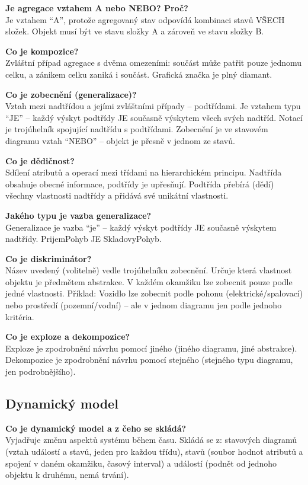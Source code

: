 \documentclass[12pt, a4paper]{article}
\begin{document}
\textbf{Je agregace vztahem A nebo NEBO? Proč?}\\
Je vztahem ``A'', protože agregovaný stav odpovídá kombinaci stavů VŠECH složek. Objekt musí být ve stavu složky A a zároveň ve stavu složky B.

\textbf{Co je kompozice?}\\
Zvláštní případ agregace s dvěma omezeními: součást může patřit pouze jednomu celku, a zánikem celku zaniká i součást. Grafická značka je plný diamant.

\textbf{Co je zobecnění (generalizace)?}\\
Vztah mezi nadtřídou a jejími zvláštními případy -- podtřídami. Je vztahem typu ``JE'' -- každý výskyt podtřídy JE současně výskytem všech svých nadtříd. Notací je trojúhelník spojující nadtřídu s podtřídami. Zobecnění je ve stavovém diagramu vztah ``NEBO'' -- objekt je přesně v jednom ze stavů.

\textbf{Co je dědičnost?}\\
Sdílení atributů a operací mezi třídami na hierarchickém principu. Nadtřída obsahuje obecné informace, podtřídy je upřesňují. Podtřída přebírá (dědí) všechny vlastnosti nadtřídy a přidává své unikátní vlastnosti.

\textbf{Jakého typu je vazba generalizace?}\\
Generalizace je vazba ``je'' -- každý výskyt podtřídy JE současně výskytem nadtřídy. PrijemPohyb JE SkladovyPohyb.

\textbf{Co je diskriminátor?}\\
Název uvedený (volitelně) vedle trojúhelníku zobecnění. Určuje která vlastnost objektu je předmětem abstrakce. V každém okamžiku lze zobecnit pouze podle jedné vlastnosti. Příklad: Vozidlo lze zobecnit podle pohonu (elektrické/spalovací) nebo prostředí (pozemní/vodní) -- ale v jednom diagramu jen podle jednoho kritéria.

\textbf{Co je exploze a dekompozice?}\\
Exploze je zpodrobnění návrhu pomocí jiného (jiného diagramu, jiné abstrakce). Dekompozice je zpodrobnění návrhu pomocí stejného (stejného typu diagramu, jen podrobnějšího).

\subsection{Dynamický model}

\textbf{Co je dynamický model a z čeho se skládá?}\\
Vyjadřuje změnu aspektů systému během času. Skládá se z: stavových diagramů (vztah událostí a stavů, jeden pro každou třídu), stavů (soubor hodnot atributů a spojení v daném okamžiku, časový interval) a událostí (podnět od jednoho objektu k druhému, nemá trvání).
\end{document}

